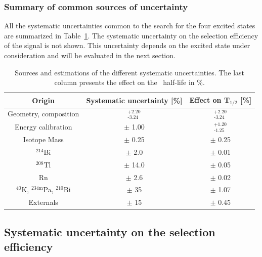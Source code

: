 \documentclass[main.tex]{subfiles}
\begin{document}
\FloatBarrier


\subsubsection{Summary of common sources of uncertainty}


\NI All the systematic uncertainties common to the search for the four excited states are summarized in Table~\ref{Table:SystCurrent}. The systematic uncertainty on the selection efficiency of the signal is not shown. This uncertainty depends on the excited state under consideration and will be evaluated in the next section.


\begin{table}
\centering
\begin{tabular}{c|c|c}
Origin                                   & Systematic uncertainty [\%] & Effect on T$_{\text{1/2}}$ [\%] \\[0.1cm]
\toprule
Geometry, composition                    & $^{\text{+2.20}}_{\text{-3.24}}$ & $^{\text{+2.20}}_{\text{-3.24}}$ \\[0.1cm]
\hline
Energy calibration                       & $\pm$ 1.00                       & $^{\text{+1.20}}_{\text{-1.25}}$ \\[0.1cm]
\hline
Isotope Mass                             & $\pm$ 0.25                       & $\pm$ 0.25 \\[0.1cm]
\hline
$^{\text{214}}$Bi                        & $\pm$ 2.0                        & $\pm$ 0.01 \\[0.1cm]
\hline
$^{\text{208}}$Tl                        & $\pm$ 14.0                       & $\pm$ 0.05 \\[0.1cm]
\hline
Rn                                       & $\pm$ 2.6                        & $\pm$ 0.02 \\[0.1cm]
\hline
$^{\text{40}}$K, $^{\text{234m}}$Pa, $^{\text{210}}$Bi & $\pm$ 35           & $\pm$ 1.07 \\[0.1cm]
\hline
Externals                                & $\pm$ 15                         & $\pm$ 0.45 \\[0.1cm]
\bottomrule
\end{tabular}
\caption{Sources and estimations of the different systematic uncertainties. The last column presents the effect on the \Cd~half-life in \%.}
\label{Table:SystCurrent}
\end{table}


\FloatBarrier


\subsection{Systematic uncertainty on the selection efficiency}\label{sec:SystematicsEvaluationEff}
\end{document}
